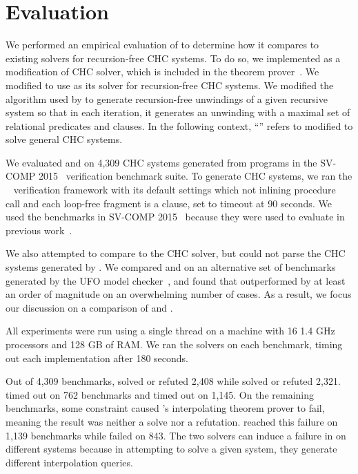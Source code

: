 \section{Evaluation}
\label{sec:evaluation}
We performed an empirical evaluation of \sys to determine how it
compares to existing solvers for recursion-free CHC systems.
%
To do so, we implemented \sys as a modification of \duality CHC
solver, which is included in the \zthree theorem prover~\cite{z3}.
%
We modified \duality to use \sys as its solver for recursion-free CHC
systems.
%
We modified the algorithm used by \duality to generate recursion-free
unwindings of a given recursive system so that in each iteration, it
generates an unwinding with a maximal set of relational predicates and
clauses.
%
In the following context, ``\sys'' refers to \duality modified to
solve general CHC systems.

We evaluated \sys and \duality on 4,309 CHC systems generated from
programs in the SV-COMP 2015~\cite{svcomp15} verification benchmark
suite.
%
To generate CHC systems, we ran the \seahorn~\cite{gurfinkel15}
verification framework with its default settings which not inlining procedure call and each 
loop-free fragment is a clause, set to timeout at 90
seconds.
%
We used the benchmarks in SV-COMP 2015~\cite{svcomp15} because they
were used to evaluate \duality in previous work~\cite{mcmillan14}.

We also attempted to compare \sys to the \eldarica CHC solver, but
\eldarica could not parse the CHC systems generated by \seahorn.
%
We compared \sys and \eldarica on an alternative set of benchmarks
generated by the UFO model checker~\cite{albarghouthi12c}, and found
that \sys outperformed \eldarica by at least an order of magnitude on
an overwhelming number of cases.
%
As a result, we focus our discussion on a comparison of \sys and
\duality.

All experiments were run using a single thread 
on a machine with 16 1.4 GHz processors and
128 GB of RAM.
%
We ran the solvers on each benchmark, timing out each implementation
after 180 seconds.

Out of 4,309 benchmarks, \sys solved or refuted 2,408 while \duality
solved or refuted 2,321. \sys timed out on 762 benchmarks and \duality
timed out on 1,145.
%
On the remaining benchmarks, some constraint caused \zthree's
interpolating theorem prover to fail, meaning the result was neither a
solve nor a refutation. \sys reached this failure on 1,139 benchmarks
while \duality failed on 843.
%
The two solvers can induce a failure in \zthree on different systems
because in attempting to solve a given system, they generate different
interpolation queries.


